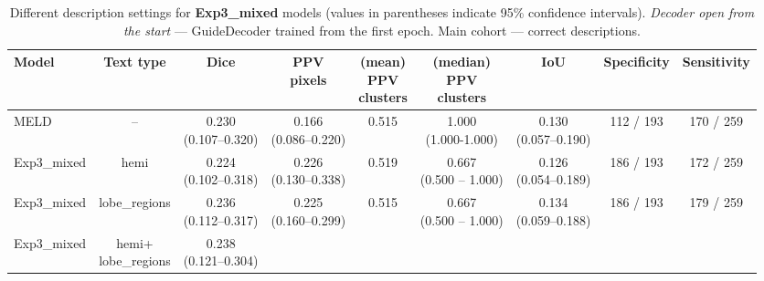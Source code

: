 \documentclass[a4paper,12pt]{article}
\begin{document}
\begin{table}[ht]
\centering
\tiny
\caption{Different description settings for \textbf{Exp3\_mixed} models (values in parentheses indicate 95\% confidence intervals). \emph{Decoder open from the start} — GuideDecoder trained from the first epoch. Main cohort — correct descriptions.}

\label{tab:main_cohort_mixed_correct}
\begin{tabular}{lcccccccc}
\textbf{Model} &
\textbf{Text type} &
\textbf{Dice} &
\makecell{\textbf{PPV}\\\textbf{pixels}} &
\makecell{\textbf{(mean)} \\\textbf{PPV} \\\textbf{clusters}} & \makecell{\textbf{(median)} \\\textbf{PPV} \\\textbf{clusters}} & 
\textbf{IoU} & 
\textbf{Specificity} &
\textbf{Sensitivity} \\
\hline
MELD & -- &
\makecell{\colorbox{orange!20}{0.230}\\(0.107--0.320)} &
\makecell{0.166\\(0.086--0.220)} &
\colorbox{orange!20}{0.515} &
\makecell{1.000 \\ (1.000-1.000)} &
\makecell{\colorbox{orange!20}{0.130}\\(0.057--0.190)} &
112 / 193 &
170 / 259 \\
\hline
Exp3\_mixed & 
hemi &  
\makecell{0.224 \\ (0.102--0.318)} &
\makecell{0.226 \\ (0.130--0.338)} &
\colorbox{blue!20}{0.519} &
\makecell{0.667 \\ (0.500 -- 1.000)}&
\makecell{0.126 \\ (0.054--0.189)} &
186 / 193 &
\colorbox{orange!20}{172 / 259} \\
\hline
Exp3\_mixed &
lobe\_regions &
\makecell{\colorbox{blue!20}{0.236} \\ (0.112--0.317)} &
\makecell{\colorbox{blue!20}{0.225} \\ (0.160--0.299)} &
\colorbox{orange!20}{0.515} &
\makecell{0.667 \\ (0.500 -- 1.000)}&
\makecell{\colorbox{blue!20}{0.134} \\ (0.059--0.188)} &
186 / 193 &
\colorbox{blue!20}{179 / 259} \\
\hline
Exp3\_mixed &
\makecell{hemi+ \\ lobe\_regions} &
\makecell{\colorbox{green!20}{0.238} \\ (0.121--0.304)} &

\end{tabular}
\end{table}
\end{document}
